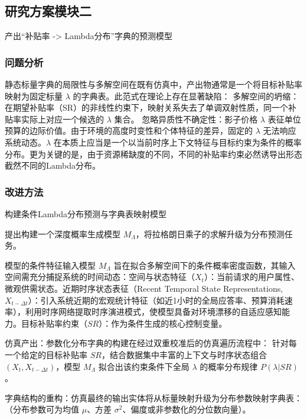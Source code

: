 \documentclass[12pt, a4paper]{article}
\begin{document}
\subsection{研究方案模块二}产出“补贴率 -> Lambda分布”字典的预测模型

\subsubsection{问题分析}

静态标量字典的局限性与多解空间在既有仿真中，产出物通常是一个将目标补贴率映射为固定标量 $\lambda$ 的字典表。此范式在理论上存在显著缺陷：
多解空间的坍缩：在期望补贴率（SR）的非线性约束下，映射关系失去了单调双射性质，同一个补贴率实际上对应一个候选的 $\lambda$ 集合。
忽略异质性不确定性：影子价格 $\lambda$ 表征单位预算的边际价值。由于环境的高度时变性和个体特征的差异，固定的 $\lambda$ 无法响应系统动态。$\lambda$ 在本质上应当是一个以当前时序上下文特征与目标约束为条件的概率分布。更为关键的是，由于资源稀缺度的不同，不同的补贴率约束必然诱导出形态截然不同的Lambda分布。

\subsubsection{改进方法}构建条件Lambda分布预测与字典表映射模型

提出构建一个深度概率生成模型 $M_\Lambda$，将拉格朗日乘子的求解升级为分布预测任务。

模型的条件特征输入模型 $M_\Lambda$ 旨在拟合多解空间下的条件概率密度函数，其输入空间需充分捕捉系统的时间动态：空间与状态特征（$X_t$）：当前请求的用户属性、微观供需状态。近期时序状态表征（Recent Temporal State Representations, $X_{t-\Delta t}$）：引入系统近期的宏观统计特征（如近1小时的全局应答率、预算消耗速率），利用时序网络提取时序演进模式，使模型具备对环境漂移的自适应感知能力。目标补贴率约束（$SR$）：作为条件生成的核心控制变量。

仿真产出：参数化分布字典的构建在经过双重校准后的仿真遍历流程中：
针对每一个给定的目标补贴率 $SR$，结合数据集中丰富的上下文与时序状态组合 $(X_t, X_{t-\Delta t})$，模型 $M_\Lambda$ 拟合出该约束条件下全局 $\lambda$ 的概率分布规律 $P(\lambda |SR)$。

字典结构的重构：仿真最终的输出实体将从标量映射升级为分布参数映射字典表：（分布参数可为均值 $\mu$、方差 $\sigma^2$、偏度或非参数化的分位数向量）。
\end{document}
